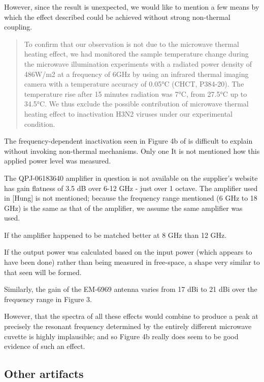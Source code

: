 \documentclass[paper.tex]{subfiles}
\begin{document}
\begin{multicols}{1}
However, since the result is unexpected, we would like to mention a few means by which the effect described could be achieved without strong non-thermal coupling.

\begin{quote}
	
	To confirm that our observation is not due to the microwave thermal heating effect, we had monitored the sample temperature change during the microwave illumination experiments with a radiated power density of 486W/m2 at a frequency of 6GHz by using an infrared thermal imaging camera with a temperature accuracy of 0.05°C (CHCT, P384-20). The temperature rise after 15 minutes radiation was 7°C, from 27.5°C up to 34.5°C. We thus exclude the possible contribution of microwave thermal heating effect to inactivation H3N2 viruses under our experimental condition.
	
\end{quote}

The frequency-dependent inactivation seen in Figure 4b of \cite{Efficient2015} is difficult to explain without invoking non-thermal mechanisms. Only one  It is not mentioned how this applied power level was measured. 

The QPJ-06183640 amplifier in question is not available on the supplier's website \cite{Microwaved} has gain flatness of 3.5 dB over 6-12 GHz - just over 1 octave. The amplifier used in [Hung] is not mentioned; because the frequency range mentioned (6 GHz to 18 GHz) is the same as that of the amplifier, we assume the same amplifier was used. 

If the amplifier happened to be matched better at 8 GHz than 12 GHz.

If the output power was calculated based on the input power (which appears to have been done) rather than being measured in free-space, a shape very similar to that seen will be formed.

Similarly, the gain of the EM-6969 antenna\cite{EM6969} varies from 17 dBi to 21 dBi over the frequency range in Figure 3.

However, that the spectra of all these effects would combine to produce a peak at precisely the resonant frequency determined by the entirely different microwave cuvette is highly implausible; and so Figure 4b really does seem to be good evidence of such an effect.


\subsection{Other artifacts}


\end{multicols}
\end{document}
